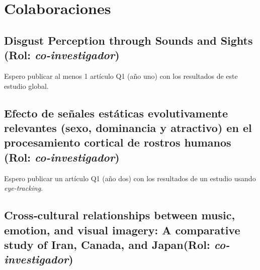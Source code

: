 \documentclass[11pt,a4paper,]{awesome-cv}
\begin{document}
\hypertarget{colaboraciones}{%
\section{Colaboraciones}\label{colaboraciones}}

\hypertarget{disgust-perception-through-sounds-and-sights-rol-co-investigador}{%
\subsection{\texorpdfstring{Disgust Perception through Sounds and Sights
(Rol:
\emph{co-investigador})}{Disgust Perception through Sounds and Sights (Rol: co-investigador)}}\label{disgust-perception-through-sounds-and-sights-rol-co-investigador}}

\begin{footnotesize}

Espero publicar al menos 1 artículo Q1 (año uno) con los resultados de este estudio global.

\end{footnotesize}

\hypertarget{efecto-de-seuxf1ales-estuxe1ticas-evolutivamente-relevantes-sexo-dominancia-y-atractivo-en-el-procesamiento-cortical-de-rostros-humanos-rol-co-investigador}{%
\subsection{\texorpdfstring{Efecto de señales estáticas evolutivamente
relevantes (sexo, dominancia y atractivo) en el procesamiento cortical
de rostros humanos (Rol:
\emph{co-investigador})}{Efecto de señales estáticas evolutivamente relevantes (sexo, dominancia y atractivo) en el procesamiento cortical de rostros humanos (Rol: co-investigador)}}\label{efecto-de-seuxf1ales-estuxe1ticas-evolutivamente-relevantes-sexo-dominancia-y-atractivo-en-el-procesamiento-cortical-de-rostros-humanos-rol-co-investigador}}

\begin{footnotesize}

Espero publicar un artículo Q1 (año dos) con los resultados de un estudio usando \textit{eye-tracking}.

\end{footnotesize}

\hypertarget{crosscultural-relationships-between-music-emotion-and-visual-imagery-a-comparative-study-of-iran-canada-and-japanrol-co-investigador}{%
\subsection{\texorpdfstring{Cross‑cultural relationships between music,
emotion, and visual imagery: A comparative study of Iran, Canada, and
Japan(Rol:
\emph{co-investigador})}{Cross‑cultural relationships between music, emotion, and visual imagery: A comparative study of Iran, Canada, and Japan(Rol: co-investigador)}}\label{crosscultural-relationships-between-music-emotion-and-visual-imagery-a-comparative-study-of-iran-canada-and-japanrol-co-investigador}}
\end{document}
